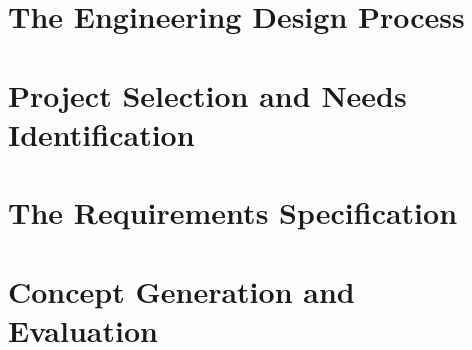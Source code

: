 \documentclass[letterpaper, 10pt]{memoir}
\begin{document}
\showanswers
\chapter{The Engineering Design Process}


\chapter{Project Selection and Needs Identification}


\chapter{The Requirements Specification}


\chapter{Concept Generation and Evaluation}


\begin{comment}








\end{comment}
\end{document}
